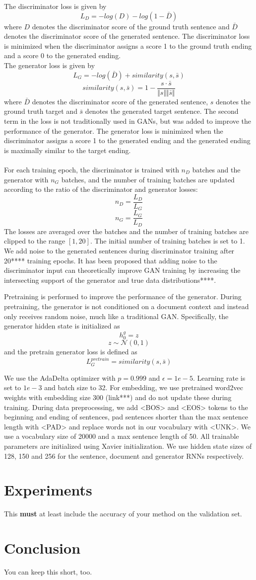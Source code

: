 \documentclass{article}
\begin{document}
The discriminator loss is given by
$$ L_{D} = -log(D) - log(1-\bar{D})$$
where $D$ denotes the discriminator score of the ground truth sentence and $\bar{D}$ denotes the discriminator score of the generated sentence. The discriminator loss is minimized when the discriminator assigns a score 1 to the ground truth ending and a score 0 to the generated ending. \\
The generator loss is given by
$$ L_{G} = -log(\bar{D}) + similarity(s, \bar{s}) $$
$$ similarity(s, \bar{s}) = 1 - \frac{s \cdot \bar{s}}{\Vert s \Vert \Vert \bar{s} \Vert} $$
where $\bar{D}$ denotes the discriminator score of the generated sentence, $s$ denotes the ground truth target and $\bar{s}$ denotes the generated target sentence. The second term in the loss is not traditionally used in GANs, but was added to improve the performance of the generator. The generator loss is minimized when the discriminator assigns a score 1 to the generated ending and the generated ending is maximally similar to the target ending. \\ \\
For each training epoch, the discriminator is trained with $n_{D}$ batches and the generator with $n_{G}$ batches, and the number of training batches are updated according to the ratio of the discriminator and generator losses:
$$ n_{D} = \frac{L_{D}}{L_{G}} $$ 
$$ n_{G} = \frac{L_{G}}{L_{D}} $$
The losses are averaged over the batches and the number of training batches are clipped to the range $[1,20]$. The initial number of training batches is set to 1.
We add noise to the generated sentences during discriminator training after 20**** training epochs. It has been proposed that adding noise to the discriminator input can theoretically improve GAN training by increasing the intersecting support of the generator and true data distributions****.

Pretraining is performed to improve the performance of the generator. During pretraining, the generator is not conditioned on a document context and instead only receives random noise, much like a traditional GAN. Specifically, the generator hidden state is initialized as
$$ h^{g}_{0} = z $$
$$ z \sim \mathcal{N}(0,1) $$
and the pretrain generator loss is defined as
$$ L_{G}^{pretrain} = similarity(s, \bar{s}) $$

We use the AdaDelta optimizer with $p=0.999$ and $\epsilon=1e-5$. Learning rate is set to $1e-3$ and batch size to 32. For embedding, we use pretrained word2vec weights with embedding size 300 (link***) and do not update these during training. During data preprocessing, we add <BOS> and <EOS> tokens to the beginning and ending of sentences, pad sentences shorter than the max sentence length with <PAD> and replace words not in our vocabulary with <UNK>. We use a vocabulary size of 20000 and a max sentence length of 50. All trainable parameters are initialized using Xavier initialization. We use hidden state sizes of 128, 150 and 256 for the sentence, document and generator RNNs respectively.

\section{Experiments}
This {\bf must} at least include the accuracy of your method on the validation set.
\section{Conclusion}
You can keep this short, too.
\end{document}
